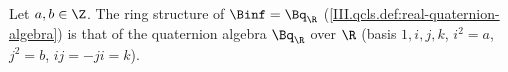 Let $a,b\in\Z$. The ring structure of $\Binf=\Bq_\R$ (\cref{III.qcls.def:real-quaternion-algebra}) is that of the quaternion algebra $\Bq_\R$ over $\R$
(basis $1,i,j,k$, $i^2=a$, $j^2=b$, $ij=-ji=k$).
